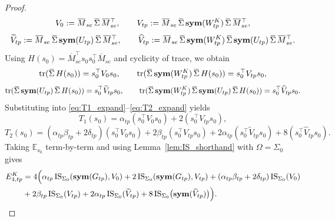 \begin{proof}
\[
V_0:=\overline M_{se}\,\overline\Sigma\,\overline M_{se}^\top,\qquad
V_{tp}:=\overline M_{se}\,\overline\Sigma\,\symfun(W^K_{tp})\,\overline\Sigma\,\overline M_{se}^\top,
\]
\[
\widetilde V_{tp}:=\overline M_{se}\,\overline\Sigma\,\symfun(U_{tp})\,\overline\Sigma\,\overline M_{se}^\top,\qquad
\widehat V_{tp}:=\overline M_{se}\,\overline\Sigma\,\symfun(W^K_{tp})\,\overline\Sigma\,\symfun(U_{tp})\,\overline\Sigma\,\overline M_{se}^\top.
\]
Using $H(s_0)=\overline M_{se}^\top s_0 s_0^\top\overline M_{se}$ and cyclicity of trace, we obtain
\[
\tr(\overline\Sigma\,H(s_0))=s_0^\top V_0 s_0,\qquad
\tr(\overline\Sigma\,\symfun(W^K_{tp})\,\overline\Sigma\,H(s_0))=s_0^\top V_{tp} s_0,
\]
\[
\tr(\overline\Sigma\,\symfun(U_{tp})\,\overline\Sigma\,H(s_0))=s_0^\top \widetilde V_{tp} s_0,\qquad
\tr(\overline\Sigma\,\symfun(W^K_{tp})\,\overline\Sigma\,\symfun(U_{tp})\,\overline\Sigma\,H(s_0))=s_0^\top \widehat V_{tp} s_0.
\]
Substituting into \eqref{eq:T1_expand}--\eqref{eq:T2_expand} yields
\[
T_1(s_0)=\alpha_{tp}(s_0^\top V_0 s_0)+2(s_0^\top V_{tp}s_0),
\]
\[
T_2(s_0)
=(\alpha_{tp}\beta_{tp}+2\delta_{tp})(s_0^\top V_0 s_0)
+2\beta_{tp}(s_0^\top V_{tp}s_0)
+2\alpha_{tp}(s_0^\top \widetilde V_{tp}s_0)
+8(s_0^\top \widehat V_{tp}s_0).
\]
Taking $\mathbb E_{s_0}$ term-by-term and using Lemma~\ref{lem:IS_shorthand} with $\Omega=\Sigma_0$ gives
\begin{align}\label{eq:Dtp_final}
E^{K}_{4,tp}
&=
4\Big(
\alpha_{tp}\,\mathrm{IS}_{\Sigma_0}(\bm{\mathrm{sym}}(G_{tp}),V_0)
+2\,\mathrm{IS}_{\Sigma_0}(\bm{\mathrm{sym}}(G_{tp}),V_{tp})
+(\alpha_{tp}\beta_{tp}+2\delta_{tp})\,\mathrm{IS}_{\Sigma_0}(V_0) \nonumber\\
&+2\beta_{tp}\,\mathrm{IS}_{\Sigma_0}(V_{tp})
+2\alpha_{tp}\,\mathrm{IS}_{\Sigma_0}(\widetilde V_{tp})
+8\,\mathrm{IS}_{\Sigma_0} \big(\bm{\mathrm{sym}}(\widehat V_{tp})\big)
\Big).
\end{align}


\end{proof}
